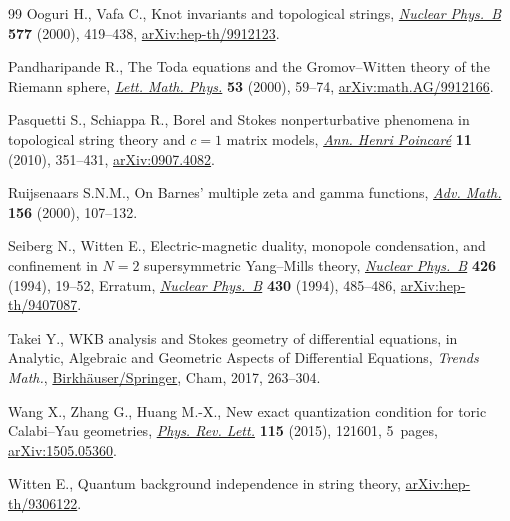 \documentclass[pdftex]{sigma}
\numberwithin{equation}{section}
\begin{document}
\begin{thebibliography}{99}
Ooguri H., Vafa C., Knot invariants and topological strings, \href{https://doi.org/10.1016/S0550-3213(00)00118-8}{\textit{Nuclear
 Phys.~B}} \textbf{577} (2000), 419--438, \href{https://arxiv.org/abs/hep-th/9912123}{arXiv:hep-th/9912123}.

Pandharipande R., The {T}oda equations and the {G}romov--{W}itten theory of the
 {R}iemann sphere, \href{https://doi.org/10.1023/A:1026571018707}{\textit{Lett. Math. Phys.}} \textbf{53} (2000), 59--74,
 \href{https://arxiv.org/abs/math.AG/9912166}{arXiv:math.AG/9912166}.

Pasquetti S., Schiappa R., Borel and {S}tokes nonperturbative phenomena in
 topological string theory and {$c=1$} matrix models, \href{https://doi.org/10.1007/s00023-010-0044-5}{\textit{Ann. Henri
 Poincar\'e}} \textbf{11} (2010), 351--431, \href{https://arxiv.org/abs/0907.4082}{arXiv:0907.4082}.

Ruijsenaars S.N.M., On {B}arnes' multiple zeta and gamma functions,
 \href{https://doi.org/10.1006/aima.2000.1946}{\textit{Adv. Math.}} \textbf{156} (2000), 107--132.

Seiberg N., Witten E., Electric-magnetic duality, monopole condensation, and
 confinement in {$N=2$} supersymmetric {Y}ang--{M}ills theory, \href{https://doi.org/10.1016/0550-3213(94)90124-4}{\textit{Nuclear
 Phys.~B}} \textbf{426} (1994), 19--52, {E}rratum,
 \href{https://doi.org/10.1016/0550-3213(94)00449-8}{\textit{Nuclear Phys.~B}}
 \textbf{430} (1994), 485--486, \href{https://arxiv.org/abs/hep-th/9407087}{arXiv:hep-th/9407087}.

Takei Y., W{KB} analysis and {S}tokes geometry of differential equations, in
 Analytic, Algebraic and Geometric Aspects of Differential Equations, \textit{Trends
 Math.}, \href{https://doi.org/10.1007/978-3-319-52842-7_5}{Birkh\"auser/Springer}, Cham, 2017, 263--304.

Wang X., Zhang G., Huang M.-X., New exact quantization condition for toric
 {C}alabi--{Y}au geometries, \href{https://doi.org/10.1103/PhysRevLett.115.121601}{\textit{Phys. Rev. Lett.}} \textbf{115} (2015),
 121601, 5~pages, \href{https://arxiv.org/abs/1505.05360}{arXiv:1505.05360}.

Witten E., Quantum background independence in string theory,
 \href{https://arxiv.org/abs/hep-th/9306122}{arXiv:hep-th/9306122}.

\end{thebibliography}\LastPageEnding
\end{document}
